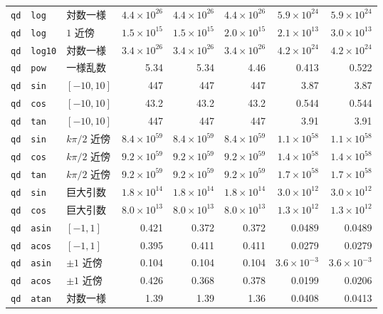 \documentclass[a4paper,10pt]{ltjsarticle}
\begin{document}
\begin{longtable}{lll rrr rr}
\texttt{qd} & \texttt{log} & 対数一様 & $4.4\times10^{26}$ & $4.4\times10^{26}$ & $4.4\times10^{26}$ & $5.9\times10^{24}$ & $5.9\times10^{24}$ \\
\texttt{qd} & \texttt{log} & $1$ 近傍 & $1.5\times10^{15}$ & $1.5\times10^{15}$ & $2.0\times10^{15}$ & $2.1\times10^{13}$ & $3.0\times10^{13}$ \\
\texttt{qd} & \texttt{log10} & 対数一様 & $3.4\times10^{26}$ & $3.4\times10^{26}$ & $3.4\times10^{26}$ & $4.2\times10^{24}$ & $4.2\times10^{24}$ \\
\texttt{qd} & \texttt{pow} & 一様乱数 & 5.34 & 5.34 & 4.46 & 0.413 & 0.522 \\
\texttt{qd} & \texttt{sin} & $[-10,10]$ & 447 & 447 & 447 & 3.87 & 3.87 \\
\texttt{qd} & \texttt{cos} & $[-10,10]$ & 43.2 & 43.2 & 43.2 & 0.544 & 0.544 \\
\texttt{qd} & \texttt{tan} & $[-10,10]$ & 447 & 447 & 447 & 3.91 & 3.91 \\
\texttt{qd} & \texttt{sin} & $k\pi/2$ 近傍 & $8.4\times10^{59}$ & $8.4\times10^{59}$ & $8.4\times10^{59}$ & $1.1\times10^{58}$ & $1.1\times10^{58}$ \\
\texttt{qd} & \texttt{cos} & $k\pi/2$ 近傍 & $9.2\times10^{59}$ & $9.2\times10^{59}$ & $9.2\times10^{59}$ & $1.4\times10^{58}$ & $1.4\times10^{58}$ \\
\texttt{qd} & \texttt{tan} & $k\pi/2$ 近傍 & $9.2\times10^{59}$ & $9.2\times10^{59}$ & $9.2\times10^{59}$ & $1.7\times10^{58}$ & $1.7\times10^{58}$ \\
\texttt{qd} & \texttt{sin} & 巨大引数 & $1.8\times10^{14}$ & $1.8\times10^{14}$ & $1.8\times10^{14}$ & $3.0\times10^{12}$ & $3.0\times10^{12}$ \\
\texttt{qd} & \texttt{cos} & 巨大引数 & $8.0\times10^{13}$ & $8.0\times10^{13}$ & $8.0\times10^{13}$ & $1.3\times10^{12}$ & $1.3\times10^{12}$ \\
\texttt{qd} & \texttt{asin} & $[-1,1]$ & 0.421 & 0.372 & 0.372 & 0.0489 & 0.0489 \\
\texttt{qd} & \texttt{acos} & $[-1,1]$ & 0.395 & 0.411 & 0.411 & 0.0279 & 0.0279 \\
\texttt{qd} & \texttt{asin} & $\pm1$ 近傍 & 0.104 & 0.104 & 0.104 & $3.6\times10^{-3}$ & $3.6\times10^{-3}$ \\
\texttt{qd} & \texttt{acos} & $\pm1$ 近傍 & 0.426 & 0.368 & 0.378 & 0.0199 & 0.0206 \\
\texttt{qd} & \texttt{atan} & 対数一様 & 1.39 & 1.39 & 1.36 & 0.0408 & 0.0413 \\

\end{longtable}
\end{document}
